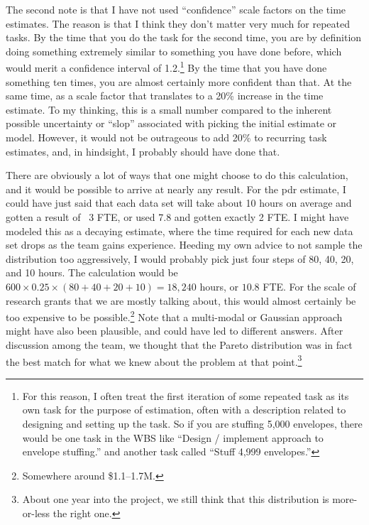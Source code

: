 \documentclass[12pt,oneside]{book}
\begin{document}
The second note is that I have not used ``confidence'' scale factors on the time estimates. The reason is that I think they don't matter very much for repeated tasks. By the time that you do the task for the second time, you are by definition doing something extremely similar to something you have done before, which would merit a confidence interval of 1.2.\footnote{For this reason, I often treat the first iteration of some repeated task as its own task for the purpose of estimation, often with a description related to designing and setting up the task. So if you are stuffing 5,000 envelopes, there would be one task in the WBS like “Design / implement approach to envelope stuffing.” and another task called “Stuff 4,999 envelopes.”
}
By the time that you have done something ten times, you are almost certainly more confident than that. At the same time, as a scale factor that translates to a 20\% increase in the time estimate. To my thinking, this is a small number compared to the inherent possible uncertainty or ``slop'' associated with picking the initial estimate or model. However, it would not be outrageous to add 20\% to recurring task estimates, and, in hindsight, I probably should have done that.

There are obviously a lot of ways that one might choose to do this calculation, and it would be possible to arrive at nearly any result. For the pdr estimate, I could have just said that each data set will take about 10 hours on average and gotten a result of ~3 FTE, or used 7.8 and gotten exactly 2 FTE. I might have modeled this as a decaying estimate, where the time required for each new data set drops as the team gains experience. Heeding my own advice to not sample the distribution too aggressively, I would probably pick just four steps of 80, 40, 20, and 10 hours. The calculation would be $600 \times 0.25 \times (80 + 40 + 20 + 10) = 18,240$ hours, or $10.8$ FTE. For the scale of research grants that we are mostly talking about, this would almost certainly be too expensive to be possible.\footnote{Somewhere around \$1.1--1.7M.} Note that a multi-modal or Gaussian approach might have also been plausible, and could have led to different answers. After discussion among the team, we thought that the Pareto distribution was in fact the best match for what we knew about the problem at that point.\footnote{About one year into the project, we still think that this distribution is more-or-less the right one.}
\end{document}
